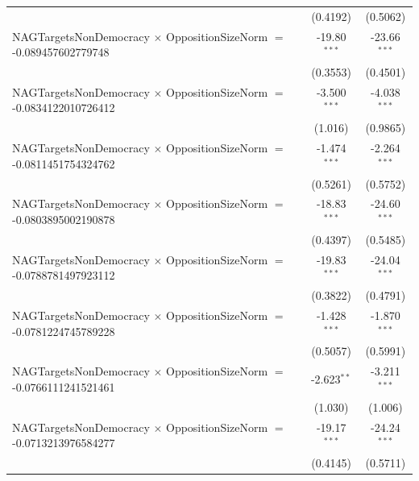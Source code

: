 \begin{tabular}{lcc}
                                                                                & (0.4192)             & (0.5062)\\   
   NAGTargetsNonDemocracy $\times$ OppositionSizeNorm $=$ -0.089457602779748    & -19.80$^{***}$       & -23.66$^{***}$\\   
                                                                                & (0.3553)             & (0.4501)\\   
   NAGTargetsNonDemocracy $\times$ OppositionSizeNorm $=$ -0.0834122010726412   & -3.500$^{***}$       & -4.038$^{***}$\\   
                                                                                & (1.016)              & (0.9865)\\   
   NAGTargetsNonDemocracy $\times$ OppositionSizeNorm $=$ -0.0811451754324762   & -1.474$^{***}$       & -2.264$^{***}$\\   
                                                                                & (0.5261)             & (0.5752)\\   
   NAGTargetsNonDemocracy $\times$ OppositionSizeNorm $=$ -0.0803895002190878   & -18.83$^{***}$       & -24.60$^{***}$\\   
                                                                                & (0.4397)             & (0.5485)\\   
   NAGTargetsNonDemocracy $\times$ OppositionSizeNorm $=$ -0.0788781497923112   & -19.83$^{***}$       & -24.04$^{***}$\\   
                                                                                & (0.3822)             & (0.4791)\\   
   NAGTargetsNonDemocracy $\times$ OppositionSizeNorm $=$ -0.0781224745789228   & -1.428$^{***}$       & -1.870$^{***}$\\   
                                                                                & (0.5057)             & (0.5991)\\   
   NAGTargetsNonDemocracy $\times$ OppositionSizeNorm $=$ -0.0766111241521461   & -2.623$^{**}$        & -3.211$^{***}$\\   
                                                                                & (1.030)              & (1.006)\\   
   NAGTargetsNonDemocracy $\times$ OppositionSizeNorm $=$ -0.0713213976584277   & -19.17$^{***}$       & -24.24$^{***}$\\   
                                                                                & (0.4145)             & (0.5711)\\   

\end{tabular}
